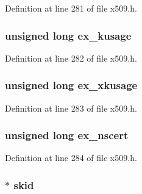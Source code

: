 Definition at line 281 of file x509.\+h.

\subsubsection[{\texorpdfstring{ex\+\_\+kusage}{ex_kusage}}]{\setlength{\rightskip}{0pt plus 5cm}unsigned long ex\+\_\+kusage}\hypertarget{structx509__st_a11b6b85c2d94c7331e52c8f0eafe99f8}{}\label{structx509__st_a11b6b85c2d94c7331e52c8f0eafe99f8}


Definition at line 282 of file x509.\+h.

\subsubsection[{\texorpdfstring{ex\+\_\+xkusage}{ex_xkusage}}]{\setlength{\rightskip}{0pt plus 5cm}unsigned long ex\+\_\+xkusage}\hypertarget{structx509__st_a4f9246ca64bd2a8fda7e0e6c72939e92}{}\label{structx509__st_a4f9246ca64bd2a8fda7e0e6c72939e92}


Definition at line 283 of file x509.\+h.

\subsubsection[{\texorpdfstring{ex\+\_\+nscert}{ex_nscert}}]{\setlength{\rightskip}{0pt plus 5cm}unsigned long ex\+\_\+nscert}\hypertarget{structx509__st_ac0ee43f888c3259b4b1e82f1ea4571d0}{}\label{structx509__st_ac0ee43f888c3259b4b1e82f1ea4571d0}


Definition at line 284 of file x509.\+h.

\subsubsection[{\texorpdfstring{skid}{skid}}]{ $\ast$ skid}\hypertarget{structx509__st_a40975b81fc3038ee271eac4fac1af7c1}{}\label{structx509__st_a40975b81fc3038ee271eac4fac1af7c1}


